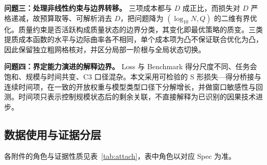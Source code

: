 \textbf{问题三：处理非线性约束与边界转移。} 三项成本都与 $D$ 成正比，而损失对 $D$ 严格递减，故预算取等、可解析消去 $D$，把问题降为 $(\log_{10}N,Q)$ 的二维有界优化。质量约束是否活跃构成质量状态的边界分类，其变化即最优策略的质变。三类提质成本函数的水平与边际曲率各不相同，单个成本项为凸不保证联合优化为凸，因此保留独立粗网格核对，并区分局部一阶根与全局状态切换。

\textbf{问题四：界定能力演进的解释边界。} Loss 与 Benchmark 得分尺度不同、任务会饱和、规模与时间共变、C3 口径混杂。本文采用可检验的 S 形损失—得分桥接与连续时间项，在一致的开放权重与模型类型口径下分解增长，并做窗口敏感性与回测。时间项只表示控制规模状态后的剩余关联，不直接解释为已识别的因果技术进步。

\subsection{数据使用与证据分层}
\label{sec:2.3}

各附件的角色与证据性质见表~\ref{tab:attach}，表中角色以对应 Spec 为准。

